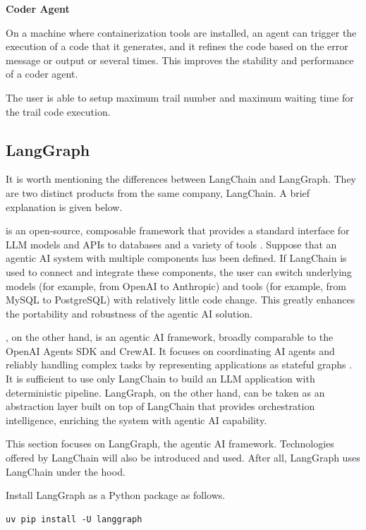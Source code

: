 \vspace{0.1in}
\noindent \textbf{Coder Agent}
\vspace{0.1in}

On a machine where containerization tools are installed, an agent can trigger the execution of a code that it generates, and it refines the code based on the error message or output or several times. This improves the stability and performance of a coder agent.

The user is able to setup maximum trail number and maximum waiting time for the trail code execution.

\subsection{LangGraph}

It is worth mentioning the differences between LangChain and LangGraph. They are two distinct products from the same company, LangChain. A brief explanation is given below.

 is an open-source, composable framework that provides a standard interface for LLM models and APIs to databases and a variety of tools \cite{langchain2025}. Suppose that an agentic AI system with multiple components has been defined. If LangChain is used to connect and integrate these components, the user can switch underlying models (for example, from OpenAI to Anthropic) and tools (for example, from MySQL to PostgreSQL) with relatively little code change. This greatly enhances the portability and robustness of the agentic AI solution.

, on the other hand, is an agentic AI framework, broadly comparable to the OpenAI Agents SDK and CrewAI. It focuses on coordinating AI agents and reliably handling complex tasks by representing applications as stateful graphs \cite{langchain2025langgraph}. It is sufficient to use only LangChain to build an LLM application with deterministic pipeline. LangGraph, on the other hand, can be taken as an abstraction layer built on top of LangChain that provides orchestration intelligence, enriching the system with agentic AI capability.

This section focuses on LangGraph, the agentic AI framework. Technologies offered by LangChain will also be introduced and used. After all, LangGraph uses LangChain under the hood.

Install LangGraph as a Python package as follows.
\begin{lstlisting}
uv pip install -U langgraph
\end{lstlisting}

